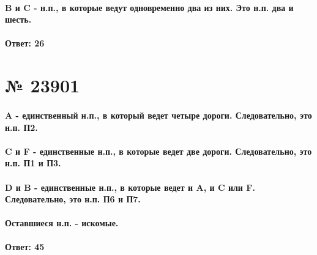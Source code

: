 \documentclass[11pt]{article} %
\begin{document}
\paragraph{B и C - н.п., в которые ведут одновременно два из них. Это н.п. два и шесть.}

\paragraph{Ответ: \textbf{26}}

\section{№ \textbf{23901}}

\paragraph{A - единственный н.п., в который ведет четыре дороги. Следовательно, это н.п. П2.}

\paragraph{C и F - единственные н.п., в которые ведет две дороги. Следовательно, это н.п. П1 и П3.}

\paragraph{D и B - единственные н.п., в которые ведет и A, и C или F. Следовательно, это н.п. П6 и П7.}

\paragraph{Оставшиеся н.п. - искомые.}

\paragraph{Ответ: \textbf{45}}
\end{document}
